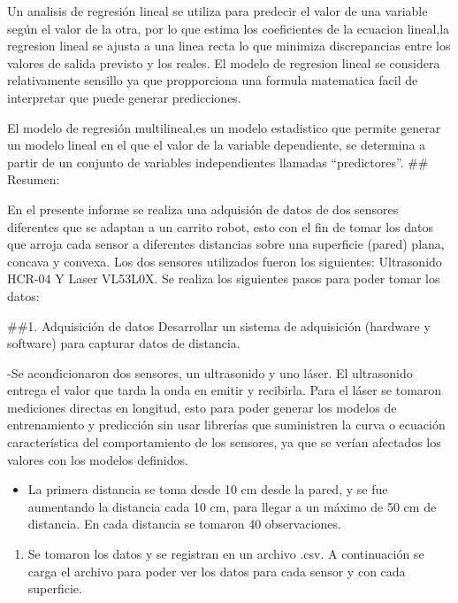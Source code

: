 \documentclass[
]{article}
\providecommand{\tightlist}{%
  \setlength{\itemsep}{0pt}\setlength{\parskip}{0pt}}
\begin{document}
Un analisis de regresión lineal se utiliza para predecir el valor de una
variable según el valor de la otra, por lo que estima los coeficientes
de la ecuacion lineal,la regresion lineal se ajusta a una linea recta lo
que minimiza discrepancias entre los valores de salida previsto y los
reales. El modelo de regresion lineal se considera relativamente
sensillo ya que propporciona una formula matematica facil de interpretar
que puede generar predicciones.

El modelo de regresión multilineal,es un modelo estadistico que permite
generar un modelo lineal en el que el valor de la variable dependiente,
se determina a partir de un conjunto de variables independientes
llamadas ``predictores''. \#\# Resumen:

En el presente informe se realiza una adquisión de datos de dos sensores
diferentes que se adaptan a un carrito robot, esto con el fin de tomar
los datos que arroja cada sensor a diferentes distancias sobre una
superficie (pared) plana, concava y convexa. Los dos sensores utilizados
fueron los siguientes: Ultrasonido HCR-04 Y Laser VL53L0X. Se realiza
los siguientes pasos para poder tomar los datos:

\#\#1. Adquisición de datos Desarrollar un sistema de adquisición
(hardware y software) para capturar datos de distancia.

-Se acondicionaron dos sensores, un ultrasonido y uno láser. El
ultrasonido entrega el valor que tarda la onda en emitir y recibirla.
Para el láser se tomaron mediciones directas en longitud, esto para
poder generar los modelos de entrenamiento y predicción sin usar
librerías que suministren la curva o ecuación característica del
comportamiento de los sensores, ya que se verían afectados los valores
con los modelos definidos.

\begin{itemize}
\tightlist
\item
  La primera distancia se toma desde 10 cm desde la pared, y se fue
  aumentando la distancia cada 10 cm, para llegar a un máximo de 50 cm
  de distancia. En cada distancia se tomaron 40 observaciones.
\end{itemize}

\begin{enumerate}
\def\labelenumi{\arabic{enumi}.}
\setcounter{enumi}{1}
\tightlist
\item
  Se tomaron los datos y se registran en un archivo .csv. A continuación
  se carga el archivo para poder ver los datos para cada sensor y con
  cada superficie.
\end{enumerate}
\end{document}
